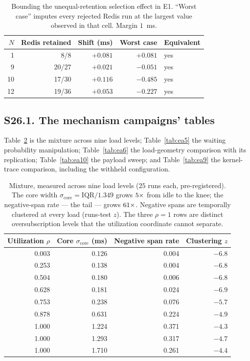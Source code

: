 \documentclass[10pt,journal,onecolumn]{IEEEtran}
\newcommand{\redis}{Redis}
\begin{document}
\begin{table}[t]
\caption[Bounding the unequal-retention selection effect in E1]{Bounding the unequal-retention selection effect in E1. ``Worst case'' imputes every rejected
\redis{} run at the largest value observed in that cell. Margin $1$~ms.}
\label{tab:selection}
\begin{tabular}{rrrrl}
\toprule
$N$ & \redis{} retained & Shift (ms) & Worst case & Equivalent \\
\midrule
1  & 8/8   & $+0.081$ & $+0.081$ & yes \\
9  & 20/27 & $+0.021$ & $-0.051$ & yes \\
10 & 17/30 & $+0.116$ & $-0.485$ & yes \\
12 & 19/36 & $+0.053$ & $-0.227$ & yes \\
\bottomrule
\end{tabular}
\end{table}




\subsection{S26.1. The mechanism campaigns' tables}
Table~\ref{tab:mixture} is the mixture across nine load levels; Table~\ref{tab:ea5} the waiting probability manipulation; Table~\ref{tab:ea6} the load-geometry comparison with its replication; Table~\ref{tab:ea10} the payload sweep; and Table~\ref{tab:ea9} the kernel-trace comparison, including the withheld configuration.

\begin{table}[t]
\caption[Mixture, measured across nine load levels ($25$ runs each, pre-registered)]{Mixture, measured across nine load levels ($25$ runs each, pre-registered). The
core width $\sigma_{\mathrm{core}} = \mathrm{IQR}/1.349$ grows $5\times$ from idle to the
knee; the negative-span rate --- the tail --- grows $61\times$. Negative spans are temporally clustered at
every load (runs-test $z$). The three $\rho=1$ rows are distinct oversubscription levels that the
utilization coordinate cannot separate.}
\label{tab:mixture}
\begin{tabular}{rrrr}
\toprule
Utilization $\rho$ & Core $\sigma_{\mathrm{core}}$ (ms) & Negative span rate & Clustering $z$ \\
\midrule
0.003 & 0.126 & 0.004 & $-6.8$ \\
0.253 & 0.138 & 0.004 & $-6.8$ \\
0.504 & 0.180 & 0.006 & $-6.8$ \\
0.628 & 0.181 & 0.024 & $-6.9$ \\
0.753 & 0.238 & 0.076 & $-5.7$ \\
0.878 & 0.631 & 0.224 & $-4.9$ \\
1.000 & 1.224 & 0.371 & $-4.3$ \\
1.000 & 1.293 & 0.317 & $-4.7$ \\
1.000 & 1.710 & 0.261 & $-4.4$ \\
\bottomrule
\end{tabular}
\end{table}
\end{document}
